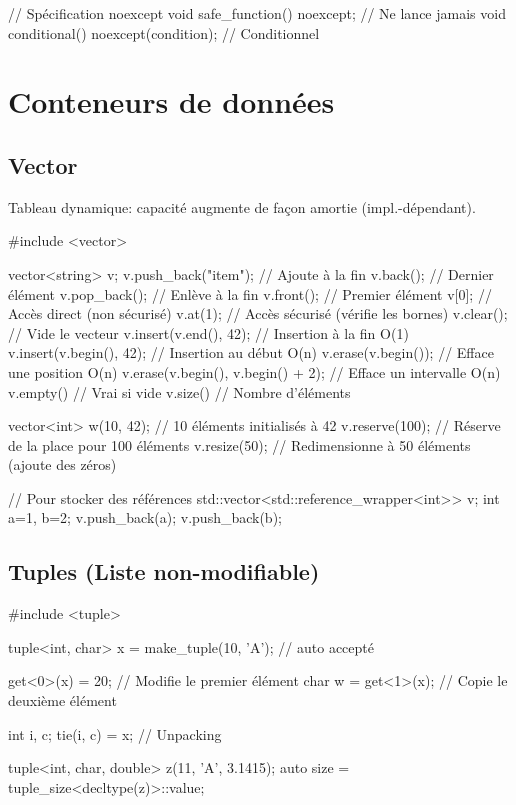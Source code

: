 \documentclass{article}
\begin{document}
\begin{multicols*}{4}
\begin{cppcode}
// Spécification noexcept
void safe_function() noexcept;          // Ne lance jamais
void conditional() noexcept(condition); // Conditionnel
\end{cppcode}

\section*{Conteneurs de données}

\subsection*{Vector}
Tableau dynamique: capacité augmente de façon amortie (impl.-dépendant).
\begin{cppcode}
#include <vector>

vector<string> v;
v.push_back("item"); // Ajoute à la fin
v.back();        // Dernier élément
v.pop_back();    // Enlève à la fin
v.front();       // Premier élément
v[0];            // Accès direct (non sécurisé)
v.at(1);         // Accès sécurisé (vérifie les bornes)
v.clear();       // Vide le vecteur
v.insert(v.end(), 42); // Insertion à la fin O(1)
v.insert(v.begin(), 42); // Insertion au début O(n)
v.erase(v.begin()); // Efface une position O(n)
v.erase(v.begin(), v.begin() + 2); // Efface un intervalle O(n)
v.empty() // Vrai si vide
v.size()  // Nombre d'éléments

vector<int> w(10, 42); // 10 éléments initialisés à 42
v.reserve(100); // Réserve de la place pour 100 éléments
v.resize(50);  // Redimensionne à 50 éléments (ajoute des zéros)

// Pour stocker des références
std::vector<std::reference_wrapper<int>> v;
int a=1, b=2; v.push_back(a); v.push_back(b);
\end{cppcode}

\subsection*{Tuples (Liste non-modifiable)}

\begin{cppcode}
#include <tuple>

tuple<int, char> x = make_tuple(10, 'A'); // auto accepté

get<0>(x) = 20; // Modifie le premier élément
char w = get<1>(x); // Copie le deuxième élément

int i, c;
tie(i, c) = x; // Unpacking

tuple<int, char, double> z(11, 'A', 3.1415);
auto size = tuple_size<decltype(z)>::value;


\end{cppcode}
\end{multicols*}
\end{document}
